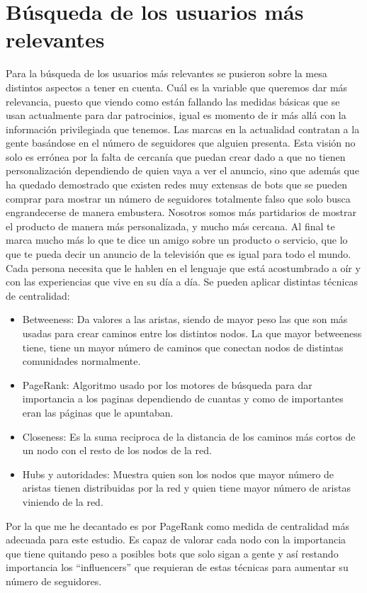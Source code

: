 \section{Búsqueda de los usuarios más relevantes}
Para la búsqueda de los usuarios más relevantes se pusieron sobre la mesa distintos aspectos a tener en cuenta. Cuál es la variable que queremos dar más relevancia, puesto que viendo como están fallando las medidas básicas que se usan actualmente para dar patrocinios, igual es momento de ir más allá con la información privilegiada que tenemos. Las marcas en la actualidad contratan a la gente basándose en el número de seguidores que alguien presenta. Esta visión no solo es errónea por la falta de cercanía que puedan crear dado a que no tienen personalización dependiendo de quien vaya a ver el anuncio, sino que además que ha quedado demostrado que existen redes muy extensas de bots que se pueden comprar para mostrar un número de seguidores totalmente falso que solo busca engrandecerse de manera embustera.
Nosotros somos más partidarios de mostrar el producto de manera más personalizada, y mucho más cercana. Al final te marca mucho más lo que te dice un amigo sobre un producto o servicio, que lo que te pueda decir un anuncio de la televisión que es igual para todo el mundo. Cada persona necesita que le hablen en el lenguaje que está acostumbrado a oír y con las experiencias que vive en su día a día.
Se pueden aplicar distintas técnicas de centralidad:
\begin{itemize}
	\item Betweeness: Da valores a las aristas, siendo de mayor peso las que son más usadas para crear caminos entre los distintos nodos. La que mayor betweeness tiene, tiene un mayor número de caminos que conectan nodos de distintas comunidades normalmente.
	\item PageRank: Algoritmo usado por los motores de búsqueda para dar importancia a los paginas dependiendo de cuantas y como de importantes eran las páginas que le apuntaban.
	\item Closeness: Es la suma reciproca de la distancia de los caminos más cortos de un nodo con el resto de los nodos de la red.
	\item Hubs y autoridades: Muestra quien son los nodos que mayor número de aristas tienen distribuidas por la red y quien tiene mayor número de aristas viniendo de la red. 
\end{itemize}
Por la que me he decantado es por PageRank como medida de centralidad más adecuada para este estudio. Es capaz de valorar cada nodo con la importancia que tiene quitando peso a posibles bots que solo sigan a gente y así restando importancia los “influencers” que requieran de estas técnicas para aumentar su número de seguidores.

